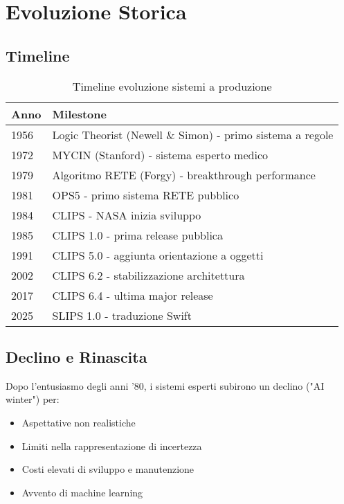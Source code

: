 \section{Evoluzione Storica}

\subsection{Timeline}

\begin{table}[h]
\centering
\small
\begin{tabular}{@{}ll@{}}
\toprule
\textbf{Anno} & \textbf{Milestone} \\
\midrule
1956 & Logic Theorist (Newell \& Simon) - primo sistema a regole \\
1972 & MYCIN (Stanford) - sistema esperto medico \\
1979 & Algoritmo RETE (Forgy) - breakthrough performance \\
1981 & OPS5 - primo sistema RETE pubblico \\
1984 & CLIPS - NASA inizia sviluppo \\
1985 & CLIPS 1.0 - prima release pubblica \\
1991 & CLIPS 5.0 - aggiunta orientazione a oggetti \\
2002 & CLIPS 6.2 - stabilizzazione architettura \\
2017 & CLIPS 6.4 - ultima major release \\
2025 & SLIPS 1.0 - traduzione Swift \\
\bottomrule
\end{tabular}
\caption{Timeline evoluzione sistemi a produzione}
\label{tab:timeline}
\end{table}

\subsection{Declino e Rinascita}

Dopo l'entusiasmo degli anni '80, i sistemi esperti subirono un declino ("AI winter") per:
\begin{itemize}
\item Aspettative non realistiche
\item Limiti nella rappresentazione di incertezza
\item Costi elevati di sviluppo e manutenzione
\item Avvento di machine learning
\end{itemize}

